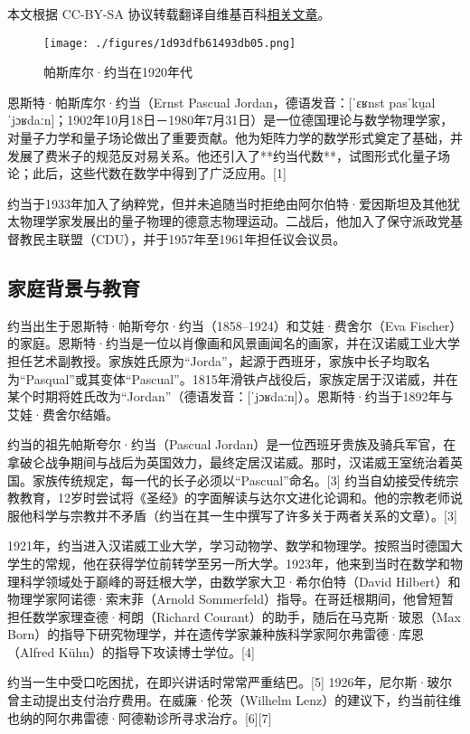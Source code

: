 
本文根据 CC-BY-SA 协议转载翻译自维基百科\href{https://en.wikipedia.org/wiki/Pascual_Jordan}{相关文章}。

\begin{figure}[ht]
\centering
\texttt{[image: ./figures/1d93dfb61493db05.png]}
\caption{帕斯库尔·约当在1920年代} \label{fig_YRD_1}
\end{figure}
恩斯特·帕斯库尔·约当（Ernst Pascual Jordan，德语发音：[ˈɛʁnst pasˈku̯al ˈjɔʁdaːn]；1902年10月18日－1980年7月31日）是一位德国理论与数学物理学家，对量子力学和量子场论做出了重要贡献。他为矩阵力学的数学形式奠定了基础，并发展了费米子的规范反对易关系。他还引入了**约当代数**，试图形式化量子场论；此后，这些代数在数学中得到了广泛应用。[1]

约当于1933年加入了纳粹党，但并未追随当时拒绝由阿尔伯特·爱因斯坦及其他犹太物理学家发展出的量子物理的德意志物理运动。二战后，他加入了保守派政党基督教民主联盟（CDU），并于1957年至1961年担任议会议员。
\subsection{家庭背景与教育}
约当出生于恩斯特·帕斯夸尔·约当（1858–1924）和艾娃·费舍尔（Eva Fischer）的家庭。恩斯特·约当是一位以肖像画和风景画闻名的画家，并在汉诺威工业大学担任艺术副教授。家族姓氏原为“Jorda”，起源于西班牙，家族中长子均取名为“Pasqual”或其变体“Pascual”。1815年滑铁卢战役后，家族定居于汉诺威，并在某个时期将姓氏改为“Jordan”（德语发音：[ˈjɔʁdaːn]）。恩斯特·约当于1892年与艾娃·费舍尔结婚。

约当的祖先帕斯夸尔·约当（Pascual Jordan）是一位西班牙贵族及骑兵军官，在拿破仑战争期间与战后为英国效力，最终定居汉诺威。那时，汉诺威王室统治着英国。家族传统规定，每一代的长子必须以“Pascual”命名。[3] 约当自幼接受传统宗教教育，12岁时尝试将《圣经》的字面解读与达尔文进化论调和。他的宗教老师说服他科学与宗教并不矛盾（约当在其一生中撰写了许多关于两者关系的文章）。[3]

1921年，约当进入汉诺威工业大学，学习动物学、数学和物理学。按照当时德国大学生的常规，他在获得学位前转学至另一所大学。1923年，他来到当时在数学和物理科学领域处于巅峰的哥廷根大学，由数学家大卫·希尔伯特（David Hilbert）和物理学家阿诺德·索末菲（Arnold Sommerfeld）指导。在哥廷根期间，他曾短暂担任数学家理查德·柯朗（Richard Courant）的助手，随后在马克斯·玻恩（Max Born）的指导下研究物理学，并在遗传学家兼种族科学家阿尔弗雷德·库恩（Alfred Kühn）的指导下攻读博士学位。[4]

约当一生中受口吃困扰，在即兴讲话时常常严重结巴。[5] 1926年，尼尔斯·玻尔曾主动提出支付治疗费用。在威廉·伦茨（Wilhelm Lenz）的建议下，约当前往维也纳的阿尔弗雷德·阿德勒诊所寻求治疗。[6][7]